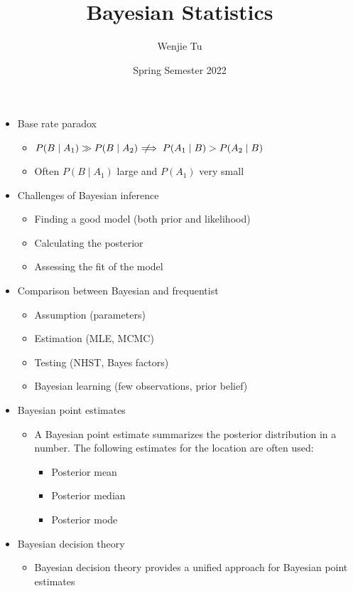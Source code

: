 \documentclass[a4paper]{article}
\title{%
    Bayesian Statistics
}
\author{Wenjie Tu}
\date{Spring Semester 2022}
\newcommand{\notimplies}{\;\not\!\!\!\implies}
\begin{document}
\maketitle

\begin{itemize}
    \item Base rate paradox
    \begin{itemize}
        \item $P(B\mid A_1)\gg P(B\mid A_2) \notimplies P(A_1\mid B)>P(A_2\mid B)$ 
        \item Often $P(B\mid A_1)$ large and $P(A_1)$ very small
    \end{itemize}
    \item Challenges of Bayesian inference
    \begin{itemize}
        \item Finding a good model (both prior and likelihood)
        \item Calculating the posterior
        \item Assessing the fit of the model
    \end{itemize}
    \item Comparison between Bayesian and frequentist
    \begin{itemize}
        \item Assumption (parameters)
        \item Estimation (MLE, MCMC)
        \item Testing (NHST, Bayes factors)
        \item Bayesian learning (few observations, prior belief)
    \end{itemize}
    \item Bayesian point estimates
    \begin{itemize}
        \item A Bayesian point estimate summarizes the posterior distribution in a number. The following estimates for the location are often used:
        \begin{itemize}
            \item Posterior mean
            \item Posterior median
            \item Posterior mode
        \end{itemize}
    \end{itemize}
    \item Bayesian decision theory
    \begin{itemize}
        \item Bayesian decision theory provides a unified approach for Bayesian point estimates

\end{itemize}
\end{itemize}
\end{document}

